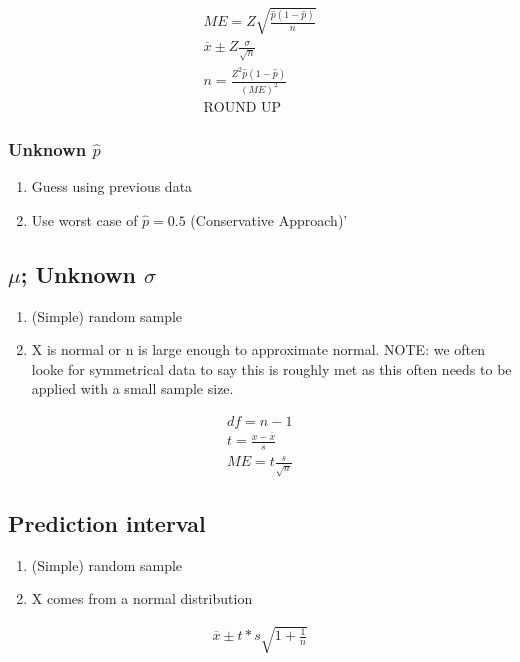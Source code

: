 \begin{align}
  ME = Z\sqrt{\frac{\hat{p}(1-\hat{p})}{n}} \\
  \overbar{x} \pm Z\frac{\sigma}{\sqrt{n}} \\
  n = \frac{Z^2\hat{p}(1 - \hat{p})}{(ME)^2} \\
  \text{ROUND UP}
\end{align}

\subsubsection{Unknown $\hat{p}$}
\begin{enumerate}
\item Guess using previous data
\item Use worst case of $\hat{p} = 0.5$ (Conservative Approach)'
\end{enumerate}

\subsection{$\mu$; Unknown $\sigma$}
\begin{enumerate}
\item (Simple) random sample
\item X is normal or n is large enough to approximate normal. NOTE: we often looke for symmetrical data to say this is roughly met as this often needs to be applied with a small sample size.
\end{enumerate}

\begin{align}
  df = n - 1 \\
  t = \frac{x - \overbar{x}}{s} \\
  ME = t\frac{s}{\sqrt{n}}
\end{align}

\subsection{Prediction interval}
\begin{enumerate}
\item (Simple) random sample
\item X comes from a normal distribution
\end{enumerate}

\begin{align}
  \overbar{x} \pm t * s\sqrt{1 + \frac{1}{n}}
\end{align}

